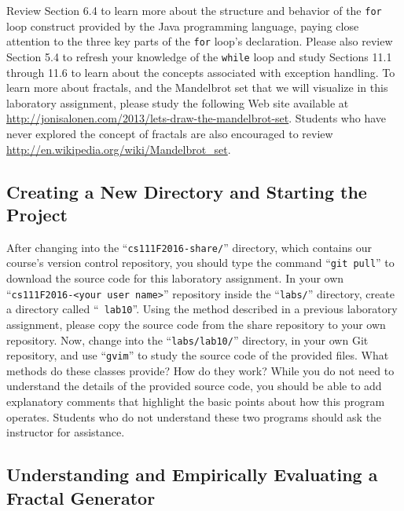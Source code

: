 Review Section 6.4 to learn more about the structure and behavior of the {\tt for} loop construct provided by the Java
programming language, paying close attention to the three key parts of the {\tt for} loop's declaration.  Please also
review Section 5.4 to refresh your knowledge of the {\tt while} loop and study Sections 11.1 through 11.6 to learn about
the concepts associated with exception handling. To learn more about fractals, and the Mandelbrot set that we will
visualize in this laboratory assignment, please study the following Web site available at
\url{http://jonisalonen.com/2013/lets-draw-the-mandelbrot-set}.  Students who have never explored the concept of
fractals are also encouraged to review \url{http://en.wikipedia.org/wiki/Mandelbrot_set}.

\vspace{-0.1in}
\subsection*{Creating a New Directory and Starting the Project}
\vspace{-0.05in}

After changing into the ``{\tt cs111F2016-share/}'' directory, which contains our course's version control repository,
you should type the command ``{\tt git pull}'' to download the source code for this laboratory assignment.  In your own
``{\tt cs111F2016-<your user name>}'' repository inside the ``{\tt labs/}'' directory, create a directory called ``{\tt
  lab10}''. Using the method described in a previous laboratory assignment, please copy the source code from the share
repository to your own repository. Now, change into the ``{\tt labs/lab10/}'' directory, in your own Git repository, and
use ``{\tt gvim}'' to study the source code of the provided files. What methods do these classes provide? How do they
work? While you do not need to understand the details of the provided source code, you should be able to add explanatory
comments that highlight the basic points about how this program operates. Students who do not understand these two programs
should ask the instructor for assistance.

\vspace{-0.1in}
\subsection*{Understanding and Empirically Evaluating a Fractal Generator}
\vspace{-0.05in}

